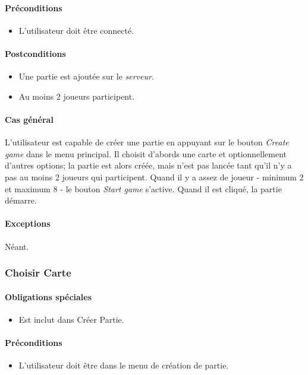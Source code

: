 \documentclass[a4paper,11pt]{report}
\begin{document}
\paragraph{Préconditions}
\begin{itemize}
 \item L'utilisateur doit être connecté.
\end{itemize}
\paragraph{Postconditions}
\begin{itemize}
 \item Une partie est ajoutée sur le \textit{serveur}.
 \item Au moins 2 joueurs participent.
\end{itemize}
\paragraph{Cas général}
L'utilisateur est capable de créer une partie en appuyant sur le bouton \og \textit{Create game} \fg dans le menu principal.
Il choisit d'abords une carte et optionnellement d'autres options; la partie est alors créée, mais n'est pas lancée tant qu'il n'y a pas au moins 2 joueurs qui participent.
Quand il y a assez de joueur - minimum 2 et maximum 8 - le bouton \og \textit{Start game} \fg s'active. Quand il est cliqué, la partie démarre.
\paragraph{Exceptions} Néant.

\newpage
\subsubsection{Choisir Carte}
\paragraph{Obligations spéciales}
\begin{itemize}
 \item Est inclut dans Créer Partie.
\end{itemize}
\paragraph{Préconditions}
\begin{itemize}
 \item L'utilisateur doit être dans le menu de création de partie.
\end{itemize}
\end{document}
